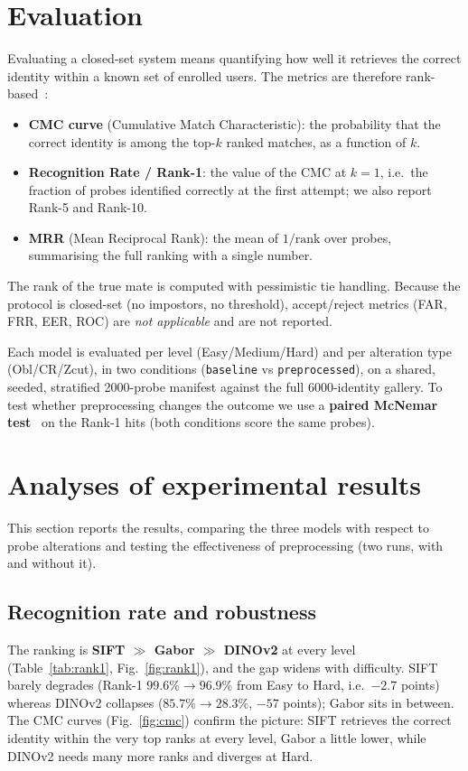 \documentclass[11pt,a4paper]{article}
\begin{document}
\section{Evaluation}
Evaluating a closed-set system means quantifying how well it retrieves the correct
identity within a known set of enrolled users. The metrics are therefore
rank-based~\cite{maltoni}:
\begin{itemize}
  \item \textbf{CMC curve} (Cumulative Match Characteristic): the probability that
    the correct identity is among the top-$k$ ranked matches, as a function of $k$.
  \item \textbf{Recognition Rate / Rank-1}: the value of the CMC at $k=1$, i.e.\ the
    fraction of probes identified correctly at the first attempt; we also report
    Rank-5 and Rank-10.
  \item \textbf{MRR} (Mean Reciprocal Rank): the mean of $1/\text{rank}$ over
    probes, summarising the full ranking with a single number.
\end{itemize}
The rank of the true mate is computed with pessimistic tie handling. Because the
protocol is closed-set (no impostors, no threshold), accept/reject metrics
(FAR, FRR, EER, ROC) are \emph{not applicable} and are not reported.

Each model is evaluated per level (Easy/Medium/Hard) and per alteration type
(Obl/CR/Zcut), in two conditions (\texttt{baseline} vs \texttt{preprocessed}), on
a shared, seeded, stratified \num{2000}-probe manifest against the full
\num{6000}-identity gallery. To test whether preprocessing changes the outcome we
use a \textbf{paired McNemar test}~\cite{mcnemar1947} on the Rank-1 hits (both
conditions score the same probes).

\section{Analyses of experimental results}
This section reports the results, comparing the three models with respect to probe
alterations and testing the effectiveness of preprocessing (two runs, with and
without it).

\subsection{Recognition rate and robustness}
The ranking is \textbf{SIFT $\gg$ Gabor $\gg$ DINOv2} at every level
(Table~\ref{tab:rank1}, Fig.~\ref{fig:rank1}), and the gap widens with difficulty.
SIFT barely degrades (Rank-1 $99.6\%\!\to\!96.9\%$ from Easy to Hard, i.e.\ $-2.7$
points) whereas DINOv2 collapses ($85.7\%\!\to\!28.3\%$, $-57$ points); Gabor sits
in between. The CMC curves (Fig.~\ref{fig:cmc}) confirm the picture: SIFT retrieves
the correct identity within the very top ranks at every level, Gabor a little
lower, while DINOv2 needs many more ranks and diverges at Hard.
\end{document}
